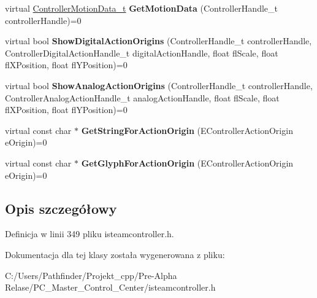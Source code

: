 \begin{DoxyCompactItemize}
virtual \hyperlink{struct_controller_motion_data__t}{Controller\+Motion\+Data\+\_\+t} {\bfseries Get\+Motion\+Data} (Controller\+Handle\+\_\+t controller\+Handle)=0
\item 
\mbox{\label{class_i_steam_controller_a59e47713e11840315a96cda3e45e61fe}} 
virtual bool {\bfseries Show\+Digital\+Action\+Origins} (Controller\+Handle\+\_\+t controller\+Handle, Controller\+Digital\+Action\+Handle\+\_\+t digital\+Action\+Handle, float fl\+Scale, float fl\+X\+Position, float fl\+Y\+Position)=0
\item 
\mbox{\label{class_i_steam_controller_a07af89602431105c5b20ec126b90a8dd}} 
virtual bool {\bfseries Show\+Analog\+Action\+Origins} (Controller\+Handle\+\_\+t controller\+Handle, Controller\+Analog\+Action\+Handle\+\_\+t analog\+Action\+Handle, float fl\+Scale, float fl\+X\+Position, float fl\+Y\+Position)=0
\item 
\mbox{\label{class_i_steam_controller_a2665be513c4364a65703a9f9c4d7bdc6}} 
virtual const char $\ast$ {\bfseries Get\+String\+For\+Action\+Origin} (E\+Controller\+Action\+Origin e\+Origin)=0
\item 
\mbox{\label{class_i_steam_controller_a329c7bc4076991b21015e727d6fd54be}} 
virtual const char $\ast$ {\bfseries Get\+Glyph\+For\+Action\+Origin} (E\+Controller\+Action\+Origin e\+Origin)=0
\end{DoxyCompactItemize}


\subsection{Opis szczegółowy}


Definicja w linii 349 pliku isteamcontroller.\+h.



Dokumentacja dla tej klasy została wygenerowana z pliku\+:\begin{DoxyCompactItemize}
\item 
C\+:/\+Users/\+Pathfinder/\+Projekt\+\_\+cpp/\+Pre-\/\+Alpha Relase/\+P\+C\+\_\+\+Master\+\_\+\+Control\+\_\+\+Center/isteamcontroller.\+h\end{DoxyCompactItemize}

